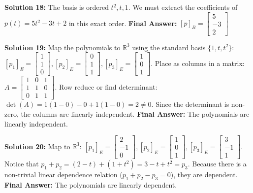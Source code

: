\documentclass{article}
\begin{document}
\vspace{0.3cm}
\textbf{Solution 18:} The basis is ordered $t^2, t, 1$. We must extract the coefficients of $p(t) = 5t^2 - 3t + 2$ in this exact order.
\textbf{Final Answer:} $[p]_B = \begin{bmatrix} 5 \\ -3 \\ 2 \end{bmatrix}$

\vspace{0.3cm}
\textbf{Solution 19:} Map the polynomials to $\mathbb{R}^3$ using the standard basis $\{1, t, t^2\}$:
$[p_1]_E = \begin{bmatrix} 1 \\ 1 \\ 0 \end{bmatrix}, [p_2]_E = \begin{bmatrix} 0 \\ 1 \\ 1 \end{bmatrix}, [p_3]_E = \begin{bmatrix} 1 \\ 0 \\ 1 \end{bmatrix}$.
Place as columns in a matrix: $A = \begin{bmatrix} 1 & 0 & 1 \\ 1 & 1 & 0 \\ 0 & 1 & 1 \end{bmatrix}$.
Row reduce or find determinant: $\det(A) = 1(1-0) - 0 + 1(1-0) = 2 \neq 0$.
Since the determinant is non-zero, the columns are linearly independent.
\textbf{Final Answer:} The polynomials are linearly independent.

\vspace{0.3cm}
\textbf{Solution 20:} Map to $\mathbb{R}^3$: $[p_1]_E = \begin{bmatrix} 2 \\ -1 \\ 0 \end{bmatrix}, [p_2]_E = \begin{bmatrix} 1 \\ 0 \\ 1 \end{bmatrix}, [p_3]_E = \begin{bmatrix} 3 \\ -1 \\ 1 \end{bmatrix}$.
Notice that $p_1 + p_2 = (2-t) + (1+t^2) = 3 - t + t^2 = p_3$.
Because there is a non-trivial linear dependence relation ($p_1 + p_2 - p_3 = 0$), they are dependent.
\textbf{Final Answer:} The polynomials are linearly dependent.
\end{document}
